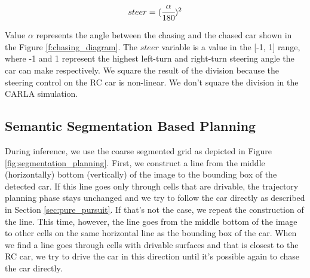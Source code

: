 \documentclass{ctuthesis/ctuthesis}
\begin{document}
\begin{equation}steer = (\cfrac{\alpha}{\textrm{180}})^{2}\end{equation}

Value $\alpha$ represents the angle between the chasing and the chased car shown in the Figure \ref{f:chasing_diagram}. The $steer$ variable is a value in the [-1, 1] range, where -1 and 1 represent the highest left-turn and right-turn steering angle the car can make respectively. We square the result of the division because the steering control on the RC car is non-linear. We don't square the division in the CARLA simulation.




\subsection{Semantic Segmentation Based Planning}
During inference, we use the coarse segmented grid as depicted in Figure \ref{fig:segmentation_planning}. First, we construct a line from the middle (horizontally) bottom (vertically) of the image to the bounding box of the detected car. If this line goes only through cells that are drivable, the trajectory planning phase stays unchanged and we try to follow the car directly as described in Section \ref{sec:pure_pursuit}. If that's not the case, we repeat the construction of the line. This time, however, the line goes from the middle bottom of the image to other cells on the same horizontal line as the bounding box of the car. When we find a line goes through cells with drivable surfaces and that is closest to the RC car, we try to drive the car in this direction until it's possible again to chase the car directly.
\end{document}
